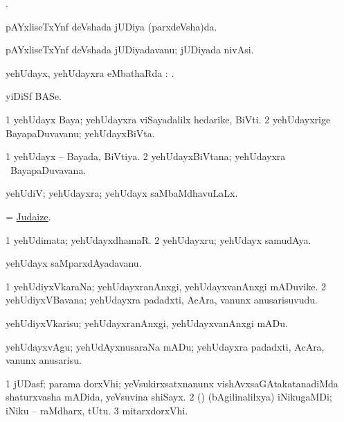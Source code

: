 \bentry
{}
\gl{\saMkiSx}
\bmng
{}. 
\emng
\eentry

\bentry
{}
\gl{\gu}
\bmng
pAYxliseTxYnf deVshada jUDiya (parxdeVsha)da. 
\emng
\eentry

\bentry
{}
\gl{\nA}
\bmng
pAYxliseTxYnf deVshada jUDiyadavanu; jUDiyada nivAsi. 
\emng
\eentry

\bentry
{}
\gl{\sapUpa}
\bmng
yehUdayx, yehUdayxra eMbathaRda \sapUpa: . 
\emng
\eentry

\bentry
{}
\gl{\nA}
\bmng
yiDiSf BASe. 
\emng
\eentry

\bentry
{}
\gl{\nA}
\bmng
\bnum
\num{1} yehUdayx Baya; yehUdayxra viSayadalilx hedarike, BiVti. 
\num{2} yehUdayxrige BayapaDuvavanu; yehUdayxBiVta. 
\enum
\emng
\eentry

\bentry
{}
\gl{\gu}
\bmng
\bnum
\num{1} yehUdayx -- Bayada, BiVtiya. 
\num{2} yehUdayxBiVtana; yehUdayxra \vi\ BayapaDuvavana. 
\enum
\emng
\eentry

\bentry
{}
\gl{\gu}
\bmng
yehUdiV; yehUdayxra; yehUdayx saMbaMdhavuLaLx. 
\emng
\eentry

\bentry
{}
\gl{\kirx}
\bmng
 = \hyperlink{Judaize}{Judaize}. 
\emng
\eentry

\bentry
{}
\gl{\nA}
\bmng
\bnum
\num{1} yehUdimata; yehUdayxdhamaR. 
\num{2} yehUdayxru; yehUdayx samudAya. 
\enum
\emng
\eentry

\bentry
{}
\gl{\nA}
\bmng
yehUdayx saMparxdAyadavanu. 
\emng
\eentry

\bentry
{}
\gl{\nA}
\bmng
\bnum
\num{1} yehUdiyxVkaraNa; yehUdayxranAnxgi, yehUdayxvanAnxgi mADuvike. 
\num{2} yehUdiyxVBavana; yehUdayxra padadxti, AcAra, \mo vanunx anusarisuvudu. 
\enum
\emng
\eentry

\bentry
{}
\gl{\sakirx}
\bmng
yehUdiyxVkarisu; yehUdayxranAnxgi, yehUdayxvanAnxgi mADu. 
\emng

\noindent
\gl{\akirx}
\bmng
yehUdayxvAgu; yehUdAyxnusaraNa mADu; yehUdayxra padadxti, AcAra, \mo vanunx anusarisu. 
\emng
\eentry

\bentry
{}
\gl{\nA}
\bmng
\bnum
\num{1} jUDasf; parama dorxVhi; yeVsukirxsatxnanunx vishAvxsaGAtakatanadiMda shaturxvasha mADida, yeVsuvina shiSayx. 
\num{2} () (bAgilinalilxya) iNikugaMDi; iNiku -- raMdharx, tUtu. 
\num{3} mitarxdorxVhi. 
\enum
\emng
\eentry


